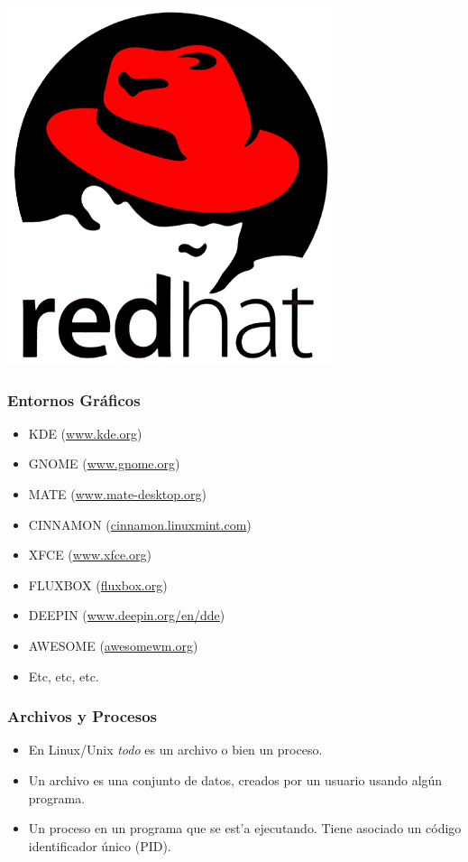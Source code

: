 \documentclass[hyperref={colorlinks}]{beamer}
\begin{document}
\begin{frame}
\begin{minipage}[b][.30\textheight][t]{.3\textwidth}
    \includegraphics[width=.7\textwidth]{figs/redhat.png}\\
    
    \end{minipage}
\end{frame}

\begin{frame}\frametitle{Entornos Gr\'aficos}
	\begin{block}{}
		\begin{itemize}
			\item KDE (\href{https://www.kde.org}{www.kde.org})
			\item GNOME (\href{https://www.gnome.org}{www.gnome.org})
			\item MATE (\href{https://www.mate-desktop.org}{www.mate-desktop.org})
			\item CINNAMON (\href{http://cinnamon.linuxmint.com}{cinnamon.linuxmint.com})
			\item XFCE (\href{https://www.xfce.org}{www.xfce.org})
			\item FLUXBOX (\href{http://fluxbox.org/}{fluxbox.org})
			\item DEEPIN (\href{https://www.deepin.org/en/dde/}{www.deepin.org/en/dde})
			\item AWESOME (\href{https://awesomewm.org/}{awesomewm.org})
			\item Etc, etc, etc. 
		\end{itemize}
	\end{block}
\end{frame}


\begin{frame}
  \frametitle{Archivos y Procesos}
  \begin{itemize}
    \item En Linux/Unix \textit{todo} es un archivo o bien un proceso.
    \item Un archivo es una conjunto de datos, creados por un usuario usando alg\'un programa.
    \item Un proceso en un programa que se est'a ejecutando. Tiene asociado un c\'odigo identificador \'unico (PID).
  \end{itemize}
\end{frame}
\end{document}
